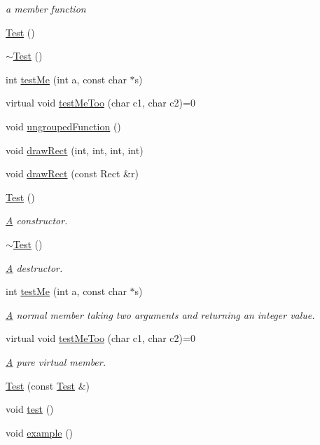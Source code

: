 \begin{DoxyCompactItemize}
\begin{DoxyCompactList}\small\item\em a member function \end{DoxyCompactList}\item 
\hyperlink{class_test_a350e5417b9f48c2f7b98937514b03da2}{Test} ()
\item 
\hyperlink{class_test_a6fba67d17f23fe2f810e5f79f4e91538}{$\sim$\-Test} ()
\item 
int \hyperlink{class_test_af1299ea1b7efeb1548c7aba201ebe756}{test\-Me} (int a, const char $\ast$s)
\item 
virtual void \hyperlink{class_test_afe4f857536cdccd2f160ad619a61eba3}{test\-Me\-Too} (char c1, char c2)=0
\item 
void \hyperlink{class_test_aacc99537766f0636d0b7859f710435c7}{ungrouped\-Function} ()
\item 
void \hyperlink{class_test_a45ad96862a0aa8ad8993a75356e3a6e2}{draw\-Rect} (int, int, int, int)
\item 
void \hyperlink{class_test_ab694ef31f21b39129051d079925cc271}{draw\-Rect} (const Rect \&r)
\item 
\hyperlink{class_test_a350e5417b9f48c2f7b98937514b03da2}{Test} ()
\begin{DoxyCompactList}\small\item\em \hyperlink{class_a}{A} constructor. \end{DoxyCompactList}\item 
\hyperlink{class_test_a6fba67d17f23fe2f810e5f79f4e91538}{$\sim$\-Test} ()
\begin{DoxyCompactList}\small\item\em \hyperlink{class_a}{A} destructor. \end{DoxyCompactList}\item 
int \hyperlink{class_test_af1299ea1b7efeb1548c7aba201ebe756}{test\-Me} (int a, const char $\ast$s)
\begin{DoxyCompactList}\small\item\em \hyperlink{class_a}{A} normal member taking two arguments and returning an integer value. \end{DoxyCompactList}\item 
virtual void \hyperlink{class_test_afe4f857536cdccd2f160ad619a61eba3}{test\-Me\-Too} (char c1, char c2)=0
\begin{DoxyCompactList}\small\item\em \hyperlink{class_a}{A} pure virtual member. \end{DoxyCompactList}\item 
\hyperlink{class_test_ae2651dabc71308c432448f45a2738ace}{Test} (const \hyperlink{class_test}{Test} \&)
\item 
void \hyperlink{class_test_ae1a3968e7947464bee7714f6d43b7002}{test} ()
\item 
\hypertarget{class_test_afa2b50f4716fc3b42221a72e676e1422}{void \hyperlink{class_test_afa2b50f4716fc3b42221a72e676e1422}{example} ()}\label{class_test_afa2b50f4716fc3b42221a72e676e1422}


\end{DoxyCompactItemize}
